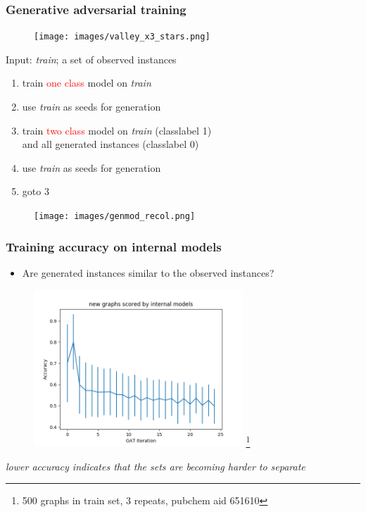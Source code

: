 \documentclass{beamer}
\newcommand{\red}[1]{\textcolor{red}{#1}}
\begin{document}
\begin{frame}
    \frametitle{Generative adversarial training}

\begin{figure}[ht]
       \centering
      \texttt{[image: images/valley\_x3\_stars.png]}
\end{figure}   
  
    Input: \emph{train}; a set of observed  instances
    \begin{enumerate}

        \item train \red{one class} model on \emph{train}
        \item use \emph{train} as seeds for generation
        \item train \red{two class} model on \emph{train} (classlabel 1) \\
            and all generated instances (classlabel 0)
        \item use \emph{train} as seeds for generation
        \item goto 3
    \end{enumerate}
    \begin{figure}[ht]
        \centering
        \texttt{[image: images/genmod\_recol.png]}
    \end{figure}
\end{frame}



\begin{frame}
    \frametitle{Training accuracy on internal models}
    \begin{itemize}
        \item Are generated instances similar to the observed instances?
    \end{itemize}

   \begin{figure}[ht]
        \centering
        \includegraphics[width=0.70\textwidth]{images/eval2.png}
        \footnote{500 graphs in train set, 3 repeats, pubchem aid 651610}
    \end{figure}
   \small{\em lower accuracy indicates that the sets are becoming harder to separate}
\end{frame}
\end{document}
